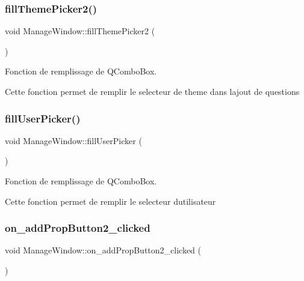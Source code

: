 \subsubsection{\texorpdfstring{fill\+Theme\+Picker2()}{fillThemePicker2()}}
{\footnotesize\ttfamily void Manage\+Window\+::fill\+Theme\+Picker2 (\begin{DoxyParamCaption}{ }\end{DoxyParamCaption})}



Fonction de remplissage de Q\+Combo\+Box. 

Cette fonction permet de remplir le selecteur de theme dans l\textquotesingle{}ajout de questions \mbox{\label{classManageWindow_a6131d13ca6962964ce8c6a37edbc4006}} 
\subsubsection{\texorpdfstring{fill\+User\+Picker()}{fillUserPicker()}}
{\footnotesize\ttfamily void Manage\+Window\+::fill\+User\+Picker (\begin{DoxyParamCaption}{ }\end{DoxyParamCaption})}



Fonction de remplissage de Q\+Combo\+Box. 

Cette fonction permet de remplir le selecteur d\textquotesingle{}utilisateur \mbox{\label{classManageWindow_a7b65c7bb9f7d022d57575db22a8e8e00}} 
\subsubsection{\texorpdfstring{on\+\_\+add\+Prop\+Button2\+\_\+clicked}{on\_addPropButton2\_clicked}}
{\footnotesize\ttfamily void Manage\+Window\+::on\+\_\+add\+Prop\+Button2\+\_\+clicked (\begin{DoxyParamCaption}{ }\end{DoxyParamCaption})\hspace{0.3cm}{\ttfamily [slot]}}




